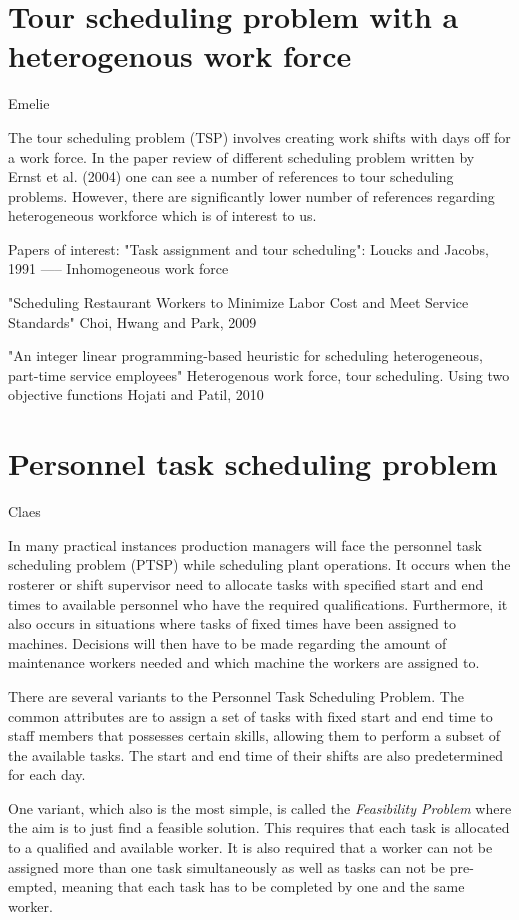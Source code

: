 \section{Tour scheduling problem with a heterogenous work force}\label{TSP}
Emelie

The tour scheduling problem (TSP) involves creating work shifts with days off for a work force. 
In the paper review of different scheduling problem written by Ernst et al. (2004) one can see a number of references to tour scheduling problems. However, there are significantly lower number of references regarding heterogeneous workforce which is of interest to us.

Papers of interest:
"Task assignment and tour scheduling": Loucks and Jacobs, 1991
----- Inhomogeneous work force

"Scheduling Restaurant Workers to Minimize Labor Cost and Meet Service Standards" Choi, Hwang and Park, 2009

"An integer linear programming-based heuristic for scheduling heterogeneous, part-time service employees" Heterogenous work force, tour scheduling. Using two objective functions Hojati and Patil, 2010


\section{Personnel task scheduling problem} \label{PTSP}
Claes

In many practical instances production managers will face the personnel task scheduling problem (PTSP) while scheduling plant operations. It occurs when the rosterer or shift supervisor need to allocate tasks with specified start and end times to available personnel who have the required qualifications. Furthermore, it also occurs in situations where tasks of fixed times have been assigned to machines. Decisions will then have to be made regarding the amount of maintenance workers needed and which machine the workers are assigned to.

There are several variants to the Personnel Task Scheduling Problem. The common attributes are to assign a set of tasks with fixed start and end time to staff members that possesses certain skills, allowing them to perform a subset of the available tasks. The start and end time of their shifts are also predetermined for each day.

One variant, which also is the most simple, is called the \textit{Feasibility Problem} where the aim is to just find a feasible solution. This requires that each task is allocated to a qualified and available worker. It is also required that a worker can not be assigned more than one task simultaneously as well as tasks can not be pre-empted, meaning that each task has to be completed by one and the same worker.

